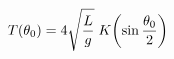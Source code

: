 \documentclass[preview]{standalone}
\begin{document}
\begin{align*}
\special{dvisvgm:raw <g id='unique000'>}T(\theta_0) = 4\sqrt{\frac{L}{g}}\; K\!\left(\sin\frac{\theta_0}{2}\right)\special{dvisvgm:raw </g>}
\end{align*}
\end{document}

